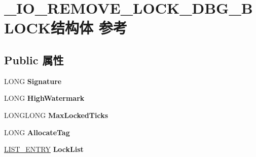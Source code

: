 \hypertarget{struct___i_o___r_e_m_o_v_e___l_o_c_k___d_b_g___b_l_o_c_k}{}\section{\+\_\+\+I\+O\+\_\+\+R\+E\+M\+O\+V\+E\+\_\+\+L\+O\+C\+K\+\_\+\+D\+B\+G\+\_\+\+B\+L\+O\+C\+K结构体 参考}
\label{struct___i_o___r_e_m_o_v_e___l_o_c_k___d_b_g___b_l_o_c_k}
\subsection*{Public 属性}
\begin{DoxyCompactItemize}
\item 
\mbox{\label{struct___i_o___r_e_m_o_v_e___l_o_c_k___d_b_g___b_l_o_c_k_af4e18ac5f66a4b7959be2b8e378842c8}} 
L\+O\+NG {\bfseries Signature}
\item 
\mbox{\label{struct___i_o___r_e_m_o_v_e___l_o_c_k___d_b_g___b_l_o_c_k_af41e23722764b0a38f136a84f8dedee8}} 
L\+O\+NG {\bfseries High\+Watermark}
\item 
\mbox{\label{struct___i_o___r_e_m_o_v_e___l_o_c_k___d_b_g___b_l_o_c_k_a67f95531612991df8ed4f028725b6a63}} 
L\+O\+N\+G\+L\+O\+NG {\bfseries Max\+Locked\+Ticks}
\item 
\mbox{\label{struct___i_o___r_e_m_o_v_e___l_o_c_k___d_b_g___b_l_o_c_k_a144b0d55b5f817691e8d679be22f872e}} 
L\+O\+NG {\bfseries Allocate\+Tag}
\item 
\mbox{\label{struct___i_o___r_e_m_o_v_e___l_o_c_k___d_b_g___b_l_o_c_k_a550a4fa832f7a8c413870650230d3615}} 
\hyperlink{struct___l_i_s_t___e_n_t_r_y}{L\+I\+S\+T\+\_\+\+E\+N\+T\+RY} {\bfseries Lock\+List}
\item 
\mbox{\label{struct___i_o___r_e_m_o_v_e___l_o_c_k___d_b_g___b_l_o_c_k_ada343ba533ada8ae2d4f272a00debd8d}} 

\end{DoxyCompactItemize}
